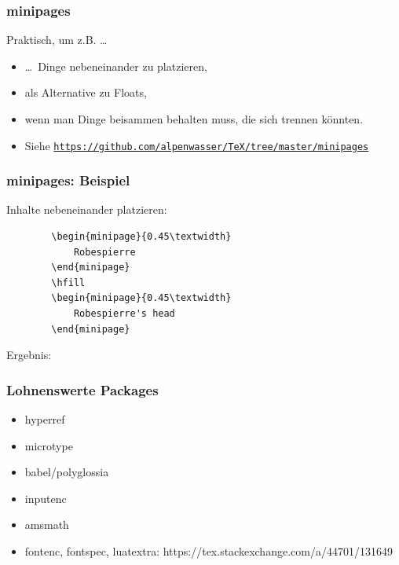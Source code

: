 \documentclass{beamer}                %
\begin{document}
\begin{frame} %
    \frametitle{minipages}

    Praktisch, um z.B. \ldots
    \begin{itemize}
        \item
            \ldots\ Dinge nebeneinander zu platzieren,
        \item
            als Alternative zu Floats,
        \item
            wenn man Dinge beisammen behalten muss, die sich trennen k\"onnten.
        \item
            Siehe
            \href{https://github.com/alpenwasser/TeX/tree/master/minipages}
                 {\nolinkurl{https://github.com/alpenwasser/TeX/tree/master/minipages}}
    \end{itemize}
\end{frame}
\begin{frame}[fragile] %
    \frametitle{minipages: Beispiel}

    Inhalte nebeneinander platzieren:

    \begin{verbatim}
        \begin{minipage}{0.45\textwidth}
            Robespierre
        \end{minipage}
        \hfill
        \begin{minipage}{0.45\textwidth}
            Robespierre's head
        \end{minipage}
    \end{verbatim}

    Ergebnis:

    \hfill
\end{frame}


\begin{frame} %
    \frametitle{Lohnenswerte Packages}
    \begin{itemize}
        \item hyperref
        \item microtype
        \item babel/polyglossia
        \item inputenc
        \item amsmath
        \item fontenc, fontspec, luatextra: https://tex.stackexchange.com/a/44701/131649
    \end{itemize}
\end{frame}
\end{document}
